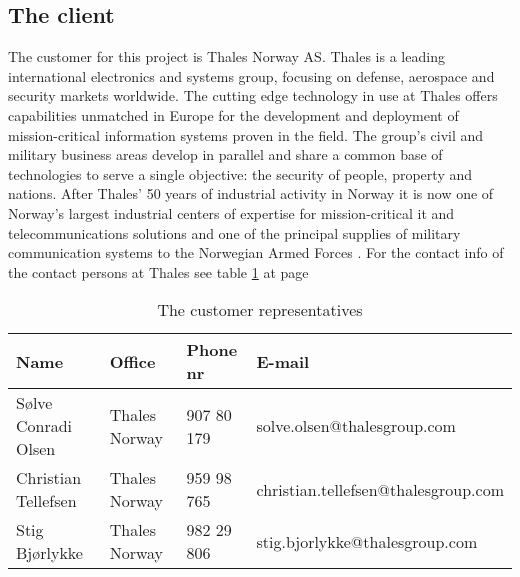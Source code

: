\subsection{The client}
The customer for this project is Thales Norway AS. Thales is a leading international electronics and systems group, focusing on defense, aerospace and security markets worldwide. The cutting edge technology in use at Thales offers capabilities unmatched in Europe for the development and deployment of mission-critical information systems proven in the field. The group’s civil and military business areas develop in parallel and share a common base of technologies to serve a single objective: the security of people, property and nations.
\newline
\newline
After Thales’ 50 years of industrial activity in Norway it is now one of Norway’s largest industrial centers of expertise for mission-critical \gls{it} and telecommunications solutions and one of the principal supplies of military communication systems to the Norwegian Armed Forces \cite{bib:thales}.
\newline
\newline
For the contact info of the contact persons at Thales see table \ref{tab:customer} at page \pageref{tab:customer}
\begin{table}
\begin{tabular}{l|l|l|l}
\hline
\textbf{Name} & \textbf{Office} & \textbf{Phone nr} & \textbf{E-mail} \\ \hline \hline
Sølve Conradi Olsen & Thales Norway & 907 80 179 & solve.olsen@thalesgroup.com \\ 
Christian Tellefsen & Thales Norway & 959 98 765 & christian.tellefsen@thalesgroup.com \\ 
Stig Bjørlykke & Thales Norway & 982 29 806 & stig.bjorlykke@thalesgroup.com \\ \hline
\end{tabular}
\caption{The customer representatives} \label{tab:customer}
\end{table}

